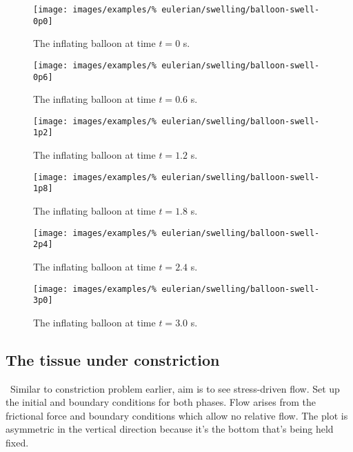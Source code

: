 \begin{figure}[!hptb]
\centering
\texttt{[image: images/examples/\%
eulerian/swelling/balloon-swell-0p0]}
\caption{The inflating balloon at time $t=0$ s.} 
\label{swelling-balloon-image-0p0}
\end{figure}

\begin{figure}[!hptb]
\centering
\texttt{[image: images/examples/\%
eulerian/swelling/balloon-swell-0p6]}
\caption{The inflating balloon at time $t=0.6$ s.} 
\label{swelling-balloon-image-0p6}
\end{figure}

\begin{figure}[!hptb]
\centering
\texttt{[image: images/examples/\%
eulerian/swelling/balloon-swell-1p2]}
\caption{The inflating balloon at time $t=1.2$ s.} 
\label{swelling-balloon-image-1p2}
\end{figure}

\begin{figure}[!hptb]
\centering
\texttt{[image: images/examples/\%
eulerian/swelling/balloon-swell-1p8]}
\caption{The inflating balloon at time $t=1.8$ s.} 
\label{swelling-balloon-image-1p8}
\end{figure}

\begin{figure}[!hptb]
\centering
\texttt{[image: images/examples/\%
eulerian/swelling/balloon-swell-2p4]}
\caption{The inflating balloon at time $t=2.4$ s.} 
\label{swelling-balloon-image-2p4}
\end{figure}

\begin{figure}[!hptb]
\centering
\texttt{[image: images/examples/\%
eulerian/swelling/balloon-swell-3p0]}
\caption{The inflating balloon at time $t=3.0$ s.} 
\label{swelling-balloon-image-3p0}
\end{figure}

\clearpage

\subsection{The tissue under constriction}
\label{constriction-2}

\textbullet\ Similar to constriction
problem earlier, aim is to see stress-driven flow. Set up the initial
and boundary conditions for both phases.  Flow arises from the
frictional force and boundary conditions which allow no relative
flow. The plot is asymmetric in the vertical direction because it's
the bottom that's being held fixed.


